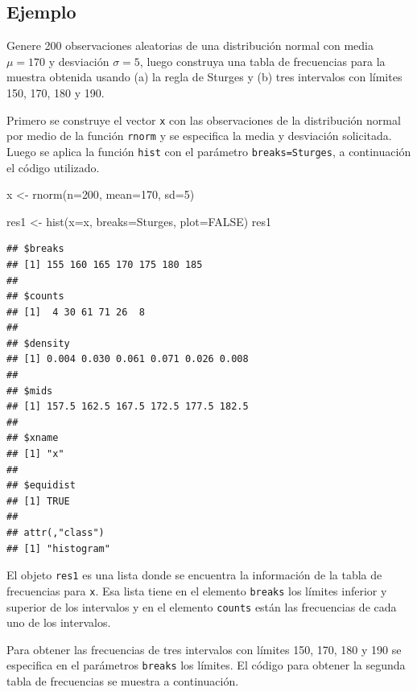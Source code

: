\documentclass[
]{book}
\makeatletter
\newenvironment{Shaded}{\begin{snugshade}}{\end{snugshade}}
\newcommand{\AttributeTok}[1]{\textcolor[rgb]{0.77,0.63,0.00}{#1}}
\newcommand{\ConstantTok}[1]{\textcolor[rgb]{0.00,0.00,0.00}{#1}}
\newcommand{\DecValTok}[1]{\textcolor[rgb]{0.00,0.00,0.81}{#1}}
\newcommand{\FunctionTok}[1]{\textcolor[rgb]{0.00,0.00,0.00}{#1}}
\newcommand{\NormalTok}[1]{#1}
\newcommand{\OtherTok}[1]{\textcolor[rgb]{0.56,0.35,0.01}{#1}}
\newcommand{\StringTok}[1]{\textcolor[rgb]{0.31,0.60,0.02}{#1}}
\newenvironment{kframe}{%
\medskip{}
\setlength{\fboxsep}{.8em}
 \def\at@end@of@kframe{}%
 \ifinner\ifhmode%
  \def\at@end@of@kframe{\end{minipage}}%
  \begin{minipage}{\columnwidth}%
 \fi\fi%
 \def\FrameCommand##1{\hskip\@totalleftmargin \hskip-\fboxsep
 \colorbox{shadecolor}{##1}\hskip-\fboxsep
     \hskip-\linewidth \hskip-\@totalleftmargin \hskip\columnwidth}%
 \MakeFramed {\advance\hsize-\width
   \@totalleftmargin\z@ \linewidth\hsize
   \@setminipage}}%
 {\par\unskip\endMakeFramed%
 \at@end@of@kframe}
\renewenvironment{Shaded}{\begin{kframe}}{\end{kframe}}
\makeatother
\begin{document}
\hypertarget{ejemplo-28}{%
\subsection*{Ejemplo}\label{ejemplo-28}}

Genere 200 observaciones aleatorias de una distribución normal con media \(\mu=170\) y desviación \(\sigma=5\), luego construya una tabla de frecuencias para la muestra obtenida usando (a) la regla de Sturges y (b) tres intervalos con límites 150, 170, 180 y 190.

Primero se construye el vector \texttt{x} con las observaciones de la distribución normal por medio de la función \texttt{rnorm} y se especifica la media y desviación solicitada. Luego se aplica la función \texttt{hist} con el parámetro \texttt{breaks=\textquotesingle{}Sturges\textquotesingle{}}, a continuación el código utilizado.

\begin{Shaded}
\begin{Highlighting}[]
\NormalTok{x }\OtherTok{\textless{}{-}} \FunctionTok{rnorm}\NormalTok{(}\AttributeTok{n=}\DecValTok{200}\NormalTok{, }\AttributeTok{mean=}\DecValTok{170}\NormalTok{, }\AttributeTok{sd=}\DecValTok{5}\NormalTok{)}

\NormalTok{res1 }\OtherTok{\textless{}{-}} \FunctionTok{hist}\NormalTok{(}\AttributeTok{x=}\NormalTok{x, }\AttributeTok{breaks=}\StringTok{\textquotesingle{}Sturges\textquotesingle{}}\NormalTok{, }\AttributeTok{plot=}\ConstantTok{FALSE}\NormalTok{)}
\NormalTok{res1}
\end{Highlighting}
\end{Shaded}

\begin{verbatim}
## $breaks
## [1] 155 160 165 170 175 180 185
## 
## $counts
## [1]  4 30 61 71 26  8
## 
## $density
## [1] 0.004 0.030 0.061 0.071 0.026 0.008
## 
## $mids
## [1] 157.5 162.5 167.5 172.5 177.5 182.5
## 
## $xname
## [1] "x"
## 
## $equidist
## [1] TRUE
## 
## attr(,"class")
## [1] "histogram"
\end{verbatim}

El objeto \texttt{res1} es una lista donde se encuentra la información de la tabla de frecuencias para \texttt{x}. Esa lista tiene en el elemento \texttt{breaks} los límites inferior y superior de los intervalos y en el elemento \texttt{counts} están las frecuencias de cada uno de los intervalos.

Para obtener las frecuencias de tres intervalos con límites 150, 170, 180 y 190 se especifica en el parámetros \texttt{breaks} los límites. El código para obtener la segunda tabla de frecuencias se muestra a continuación.
\end{document}
